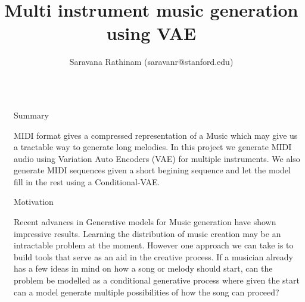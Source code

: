 \documentclass[final]{beamer}
\title{Multi instrument music generation using VAE} %
\author{Saravana Rathinam (saravanr@stanford.edu)} %
\institute{SCPD Student, Stanford University} %
\newlength{\sepwid}
\newlength{\onecolwid}
\begin{document}

\setlength{\belowcaptionskip}{2ex} %
\setlength\belowdisplayshortskip{2ex} %

\begin{frame}[t] %

\begin{columns}[t] %

\begin{column}{\sepwid}\end{column} %

\begin{column}{\onecolwid} %


\begin{alertblock}{Summary}

MIDI format gives a compressed representation of
a Music which may give us a tractable way to generate long melodies. In this project we generate MIDI audio using Variation Auto Encoders (VAE) for multiple instruments. We also generate MIDI sequences given a short begining sequence and let the model fill in the rest using a Conditional-VAE.

\end{alertblock}

\begin{block}{Motivation}

Recent advances in Generative models
for Music generation have shown impressive results. Learning the distribution of music creation may be an intractable problem at the moment.
However one approach we can take is to build tools that serve as an aid in the creative process. If a
musician already has a few ideas in mind on how a song or melody should start, can the problem be
modelled as a conditional generative process where given the start can a model
generate multiple possibilities of how the song can proceed?
\end{block}



\end{column}
\end{columns}
\end{frame}
\end{document}
